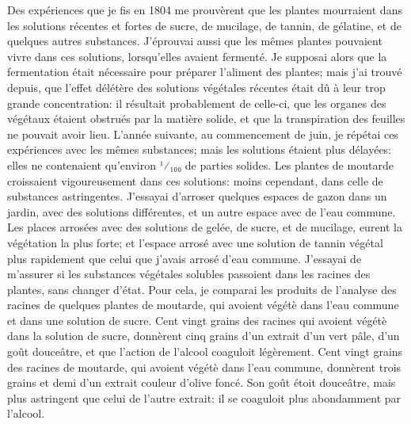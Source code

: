 \setcounter{page}{147} Des expériences que je fis en 1804 me prouvèrent que les plantes mourraient dans les solutions récentes et fortes de sucre, de mucilage, de tannin, de gélatine, et de quelques autres substances. J'éprouvai aussi que les mêmes plantes pouvaient vivre dans ces solutions, lorsqu'elles avaient fermenté. Je supposai alors que la fermentation était nécessaire pour préparer l'aliment des plantes; mais j'ai trouvé depuis, que l'effet délétère des solutions végétales récentes était dû à leur trop grande concentration: il résultait probablement de celle-ci, que les organes des végétaux étaient obstrués par la matière solide, et que la transpiration des feuilles ne pouvait avoir lieu. L'année suivante, au commencement de juin, je répétai ces expériences avec les mêmes substances; mais les solutions étaient plus délayées: elles ne contenaient qu'environ ¹⁄₁₀₀ de parties solides. Les plantes de moutarde croissaient vigoureusement dans ces solutions: moins cependant, dans celle de substances astringentes.
J'essayai d'arroser quelques espaces de gazon dans un jardin, avec des solutions différentes, et un autre espace avec de l'eau commune. Les places arrosées avec des solutions de gelée, de sucre, et de mucilage, eurent la végétation\setcounter{page}{148} la plus forte; et l'espace arrosé avec une solution de tannin végétal plus rapidement que celui que j'avais arrosé d'eau commune.
J'essayai de m'assurer si les substances végétales solubles passoient dans les racines des plantes, sans changer d'état. Pour cela, je comparai les produits de l'analyse des racines de quelques plantes de moutarde, qui avoient végétè dans l'eau commune et dans une solution de sucre. Cent vingt grains des racines qui avoient végétè dans la solution de sucre, donnèrent cinq grains d'un extrait d'un vert pâle, d'un goût douceâtre, et que l'action de l'alcool coaguloit légèrement. Cent vingt grains des racines de moutarde, qui avoient végétè dans l'eau commune, donnèrent trois grains et demi d'un extrait couleur d'olive foncé. Son goût étoit douceâtre, mais plus astringent que celui de l'autre extrait: il se coaguloit plus abondamment par l'alcool.
